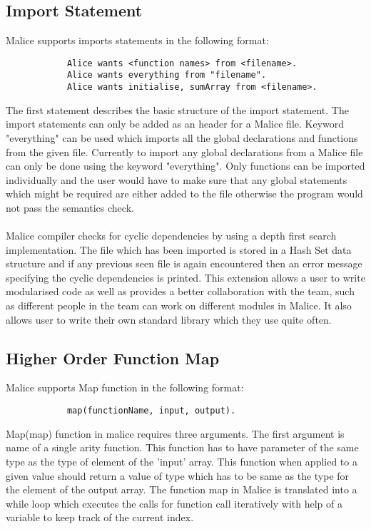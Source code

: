 \documentclass[a4wide, 11pt]{article}
\begin{document}
	\subsection{Import Statement}
		Malice supports imports statements in the following format:
		\begin{verbatim}
		    Alice wants <function names> from <filename>.
		    Alice wants everything from "filename".
		    Alice wants initialise, sumArray from <filename>.
		\end{verbatim}
		The first statement describes the basic structure of the import statement. The import statements can only be added as an header for a 
		Malice file. Keyword "everything" can be used which imports all the global declarations and functions from the given file. 
		Currently to import any global declarations from a Malice file can only be done using the keyword "everything". Only functions can be
		imported individually and the user would have to make sure that any global statements which might be required are either added to the 
		file otherwise the program would not pass the semantics check. 
		\\
		\\
		Malice compiler checks for cyclic dependencies by using a depth first search implementation. The file which has been imported is stored
		in a Hash Set data structure and if any previous seen file is again encountered then an error message specifying the cyclic dependencies
		is printed. This extension allows a user to write modularised code as well as provides a better collaboration with the team, such as
		different people in the team can work on different modules in Malice. It also allows user to write their own standard library which they
		use quite often.

	\subsection{Higher Order Function Map}
		Malice supports Map function in the following format:
		\begin{verbatim}
		    map(functionName, input, output).
		\end{verbatim}
		Map(map) function in malice requires three arguments. The first argument is name of a single arity function. This function has
		to have parameter of the same type as the type of element of the 'input' array. This function when applied to a given value should
		return a value of type which has to be same as the type for the element of the output array. The function map in Malice is translated
		into a while loop which executes the calls for function call iteratively with help of a variable to keep track of the current index.
		
\end{document}
